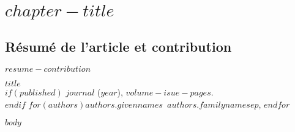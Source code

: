 \graphicspath{{chapter$chapter-number$/}{manuscript/}}

\chapter{\textbf{ $chapter-title$}}

\section{Résumé de l'article et contribution}

$resume-contribution$

\vfill{}
\pagebreak

\begin{center}
\textbf{$title$} \\
$if(published)$
\textit{$journal$} ($year$), $volume-isue-pages$. \\
$endif$
$for(authors)$$authors.givennames$~$authors.familyname$$sep$, $endfor$
\end{center}

$body$

\newpage

\singlespacing
{\renewcommand{\bibname}{References}
\renewcommand{\bibsection}{\section{\bibname}}
}
